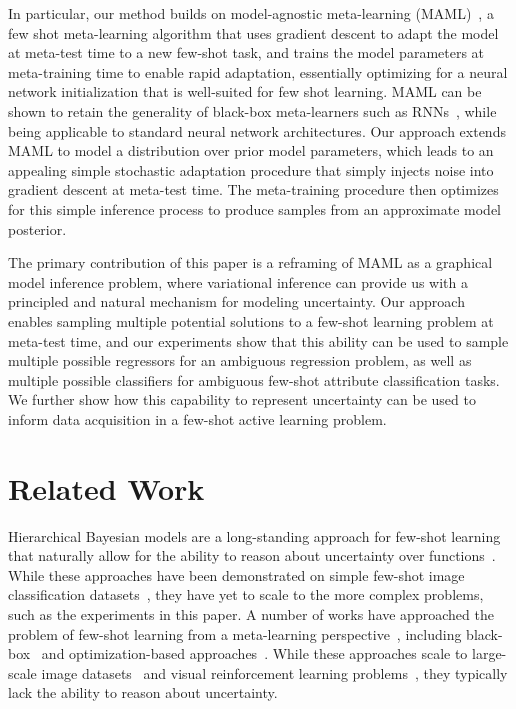 \documentclass{article}
\begin{document}
In particular, our method builds on model-agnostic meta-learning (MAML)~\cite{finn2017model}, a few shot meta-learning algorithm that uses gradient descent to adapt the model at meta-test time to a new few-shot task, and trains the model parameters at meta-training time to enable rapid adaptation, essentially optimizing for a neural network initialization that is well-suited for few shot learning. MAML can be shown to retain the generality of black-box meta-learners such as RNNs~\cite{finn2017meta}, while being applicable to standard neural network architectures. Our approach extends MAML to model a distribution over prior model parameters, which leads to an appealing simple stochastic adaptation procedure that simply injects noise into gradient descent at meta-test time. The meta-training procedure then optimizes for this simple inference process to produce samples from an approximate model posterior.

The primary contribution of this paper is a reframing of MAML as a graphical model inference problem, where variational inference can provide us with a principled and natural mechanism for modeling uncertainty. Our approach enables sampling multiple potential solutions to a few-shot learning problem at meta-test time, and our experiments show that this ability can be used to sample multiple possible regressors for an ambiguous regression problem, as well as multiple possible classifiers for ambiguous few-shot attribute classification tasks. We further show how this capability to represent uncertainty can be used to inform data acquisition in a few-shot active learning problem.





 
\vspace{-0.4cm}
\section{Related Work}
\label{sec:related}
\vspace{-0.3cm}

Hierarchical Bayesian models are a long-standing approach for few-shot learning that naturally allow for the ability to reason about uncertainty over functions~\citep{tenenbaum1999bayesian,fei2003bayesian,lawrence2004learning,yu2005learning,gao2008knowledge,daume2009bayesian,wan2012sparse}. While these approaches have been demonstrated on simple few-shot image classification datasets~\cite{lake2015human}, they have yet to scale to the more complex problems, such as the experiments in this paper. A number of works have approached the problem of few-shot learning from a meta-learning perspective~\cite{schmidhuber1987evolutionary,hochreiter2001learning}, including black-box~\cite{santoro2016meta,duan2016rl,wang2016learning} and optimization-based approaches~\cite{ravi2017optimization,finn2017model}. While these approaches scale to large-scale image datasets~\cite{vinyals2016matching} and visual reinforcement learning problems~\cite{mishra2018a}, they typically lack the ability to reason about uncertainty.
\end{document}
